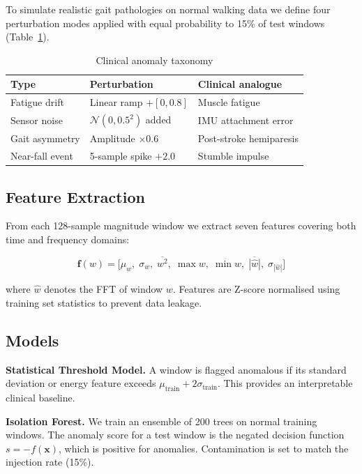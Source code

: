 \documentclass[conference]{IEEEtran}
\begin{document}
To simulate realistic gait pathologies on normal walking data we define
four perturbation modes applied with equal probability to 15\% of test
windows (Table~\ref{tab:anomaly_types}).

\begin{table}[h]
\caption{Clinical anomaly taxonomy}
\label{tab:anomaly_types}
\centering
\begin{tabular}{@{}lll@{}}
\toprule
\textbf{Type} & \textbf{Perturbation} & \textbf{Clinical analogue} \\
\midrule
Fatigue drift        & Linear ramp $+[0, 0.8]$ & Muscle fatigue \cite{maki1997} \\
Sensor noise         & $\mathcal{N}(0, 0.5^2)$ added & IMU attachment error \cite{faber2018} \\
Gait asymmetry       & Amplitude $\times 0.6$   & Post-stroke hemiparesis \cite{patterson2010} \\
Near-fall event      & 5-sample spike $+2.0$    & Stumble impulse \cite{bourke2007} \\
\bottomrule
\end{tabular}
\end{table}

\subsection{Feature Extraction}

From each 128-sample magnitude window we extract seven features covering
both time and frequency domains:

\begin{equation}
\mathbf{f}(w) = \bigl[
  \mu_w,\; \sigma_w,\; \overline{w^2},\;
  \max w,\; \min w,\;
  \overline{|\hat{w}|},\; \sigma_{|\hat{w}|}
\bigr]
\end{equation}

where $\hat{w}$ denotes the FFT of window $w$.
Features are Z-score normalised using training set statistics to prevent
data leakage.

\subsection{Models}

\textbf{Statistical Threshold Model.}
A window is flagged anomalous if its standard deviation or energy feature
exceeds $\mu_{\text{train}} + 2\sigma_{\text{train}}$.
This provides an interpretable clinical baseline.

\textbf{Isolation Forest.}
We train an ensemble of 200 trees on normal training windows.
The anomaly score for a test window is the negated decision function
$s = -f(\mathbf{x})$, which is positive for anomalies.
Contamination is set to match the injection rate (15\%).
\end{document}
